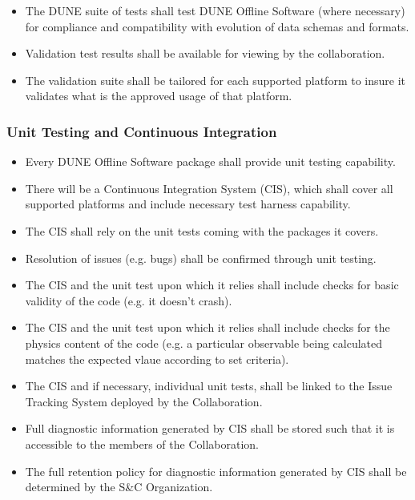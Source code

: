 \begin{itemize}
\item The DUNE suite of tests shall test DUNE Offline Software (where necessary) for compliance and compatibility with evolution of data schemas and formats.

\item Validation test results shall be available for viewing by the collaboration.

\item The validation suite shall be tailored for each supported platform to insure it validates what is the approved usage of that platform.

\end{itemize}

\subsubsection{Unit Testing and Continuous Integration}
\begin{itemize}
\item Every DUNE Offline Software package shall provide unit testing capability.

\item There will be a Continuous Integration System (CIS), which shall cover all supported platforms and include necessary test harness capability.

\item The CIS shall rely on the unit tests coming with the packages it covers.

\item Resolution of issues (e.g. bugs) shall be confirmed through unit testing.

\item The CIS and the unit test upon which it relies shall include checks for basic validity of the code (e.g. it doesn't crash).

\item The CIS and the unit test upon which it relies shall include checks for the physics content of the code (e.g. a particular observable being calculated matches the expected vlaue according to set criteria).

\item The CIS and if necessary, individual unit tests, shall be linked to the Issue Tracking System deployed by the Collaboration.

\item Full diagnostic information generated by CIS shall be stored such that it is accessible to the members of the Collaboration.

\item The full retention policy for diagnostic information generated by CIS shall be determined by the S\&C Organization.
\end{itemize}


